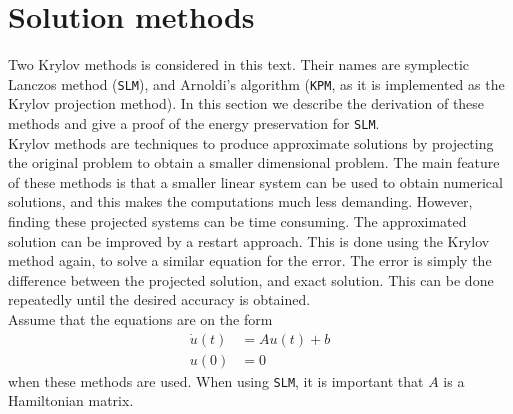 \section{Solution methods} \label{sec:solmet} %

\noindent Two Krylov methods is considered in this text. Their names are symplectic Lanczos method (\texttt{SLM}), and Arnoldi's algorithm (\texttt{KPM}, as it is implemented as the Krylov projection method). In this section we describe the derivation of these methods and give a proof of the energy preservation for \texttt{SLM}. \\

\noindent Krylov methods are techniques to produce approximate solutions by projecting the original problem to obtain a smaller dimensional problem. The main feature of these methods is that a smaller linear system can be used to obtain numerical solutions, and this makes the computations much less demanding. However, finding these projected systems can be time consuming. The approximated solution can be improved by a restart approach. This is done using the Krylov method again, to solve a similar equation for the error. The error is simply the difference between the projected solution, and exact solution. This can be done repeatedly until the desired accuracy is obtained. \\


\noindent Assume that the equations are on the form
\begin{equation}
\begin{aligned}
\dot{u}(t) &= Au(t) + b \\
u(0) &= 0
\end{aligned}
\label{eqn:PMform}
\end{equation}
\noindent when these methods are used.  %
When using \texttt{SLM}, it is important that $A$ is a Hamiltonian matrix. \\


